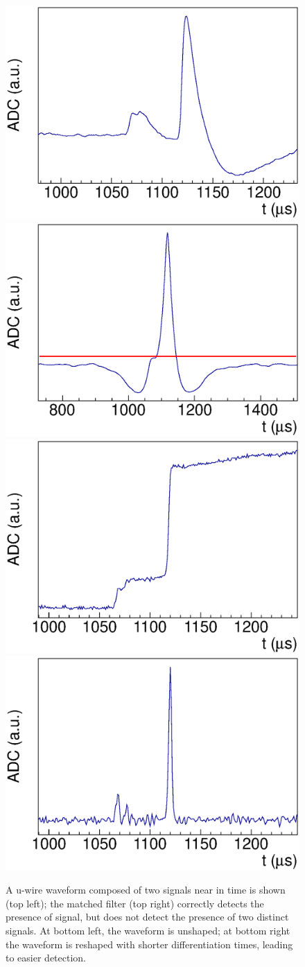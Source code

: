 \begin{figure}
\begin{center}
\includegraphics[keepaspectratio=true,width=.49\textwidth]{MSF_Raw.eps}
\includegraphics[keepaspectratio=true,width=.49\textwidth]{MSF_MatchedFilter.eps}
\includegraphics[keepaspectratio=true,width=.49\textwidth]{MSF_Unshaped.eps}
\includegraphics[keepaspectratio=true,width=.49\textwidth]{MSF_Reshaped.eps}
\end{center}
\renewcommand{\baselinestretch}{1}
\small\normalsize
\begin{quote}
\caption{A u-wire waveform composed of two signals near in time is shown (top left); the matched filter (top right) correctly detects the presence of signal, but does not detect the presence of two distinct signals.  At bottom left, the waveform is unshaped; at bottom right the waveform is reshaped with shorter differentiation times, leading to easier detection.~\cite{ReconstructionDocument}}
\label{fig:MultipleSignalFinderApplication}
\end{quote}
\end{figure}
\renewcommand{\baselinestretch}{2}
\small\normalsize

